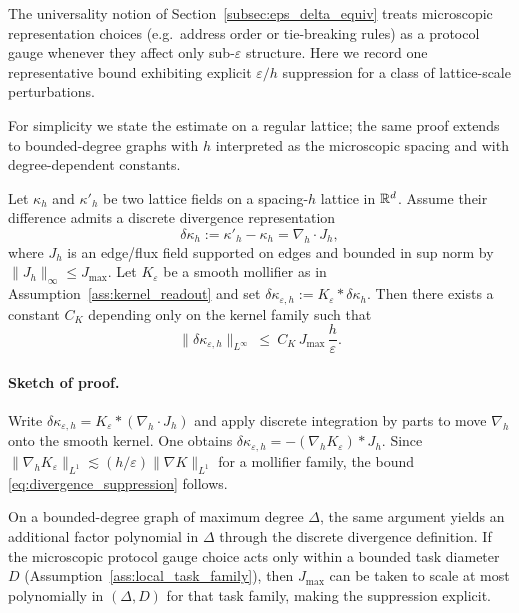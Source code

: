 The universality notion of Section~\ref{subsec:eps_delta_equiv} treats microscopic representation choices (e.g.\ address order or tie-breaking rules) as a protocol gauge whenever they affect only sub-$\varepsilon$ structure.
Here we record one representative bound exhibiting explicit $\varepsilon/h$ suppression for a class of lattice-scale perturbations.
\par
\noindent For simplicity we state the estimate on a regular lattice; the same proof extends to bounded-degree graphs with $h$ interpreted as the microscopic spacing and with degree-dependent constants.

\begin{proposition}
\label{prop:divergence_form_suppression}
Let $\kappa_h$ and $\kappa'_h$ be two lattice fields on a spacing-$h$ lattice in $\mathbb{R}^d$.
Assume their difference admits a discrete divergence representation
\begin{equation}
  \delta\kappa_h := \kappa'_h-\kappa_h = \nabla_h\cdot J_h,
\end{equation}
where $J_h$ is an edge/flux field supported on edges and bounded in sup norm by $\|J_h\|_\infty\le J_{\max}$.
Let $K_\varepsilon$ be a smooth mollifier as in Assumption~\ref{ass:kernel_readout} and set $\delta\kappa_{\varepsilon,h}:=K_\varepsilon * \delta\kappa_h$.
Then there exists a constant $C_K$ depending only on the kernel family such that
\begin{equation}
  \|\delta\kappa_{\varepsilon,h}\|_{L^\infty}
  \ \le\ C_K\,J_{\max}\,\frac{h}{\varepsilon}.
  \label{eq:divergence_suppression}
\end{equation}
\end{proposition}

\paragraph{Sketch of proof.}
Write $\delta\kappa_{\varepsilon,h}=K_\varepsilon*(\nabla_h\cdot J_h)$ and apply discrete integration by parts to move $\nabla_h$ onto the smooth kernel.
One obtains $\delta\kappa_{\varepsilon,h}=-(\nabla_h K_\varepsilon)*J_h$.
Since $\|\nabla_h K_\varepsilon\|_{L^1}\lesssim (h/\varepsilon)\|\nabla K\|_{L^1}$ for a mollifier family, the bound \eqref{eq:divergence_suppression} follows.
\par
\noindent On a bounded-degree graph of maximum degree $\Delta$, the same argument yields an additional factor polynomial in $\Delta$ through the discrete divergence definition.
If the microscopic protocol gauge choice acts only within a bounded task diameter $D$ (Assumption~\ref{ass:local_task_family}), then $J_{\max}$ can be taken to scale at most polynomially in $(\Delta,D)$ for that task family, making the suppression explicit.


